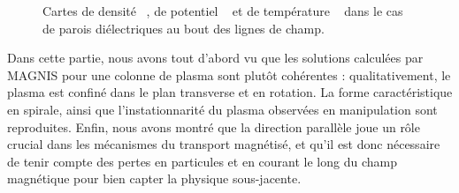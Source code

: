\begin{refsection}
\begin{figure}[!htbp]
  \centering
    \caption{Cartes de densité ~, de
    potentiel ~ et de
    température ~ dans le cas de parois
    diélectriques au bout des lignes de champ.}
    \label{CybeleCartesIsolant}
\end{figure}		

Dans cette partie, nous avons tout d'abord vu que 
les solutions calculées par MAGNIS pour une colonne de plasma
sont plutôt cohérentes : qualitativement, le plasma est confiné dans le plan
transverse et en rotation. La forme caractéristique en spirale, ainsi que
l'instationnarité du plasma observées en manipulation sont reproduites. 
Enfin, nous avons montré que la direction parallèle joue un rôle crucial dans
les mécanismes du transport magnétisé, et qu'il est donc nécessaire de
tenir compte des pertes en particules et en courant le long du champ magnétique
pour bien capter la physique sous-jacente.


\end{refsection}
